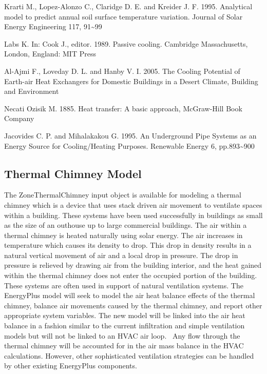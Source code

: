 Krarti M., Lopez-Alonzo C., Claridge D. E. and Kreider J. F. 1995. Analytical model to predict annual soil surface temperature variation. Journal of Solar Energy Engineering 117, 91\textasciitilde{}99

Labs K. In: Cook J., editor. 1989. Passive cooling. Cambridge Massachusetts, London, England: MIT Press

Al-Ajmi F., Loveday D. L. and Hanby V. I. 2005. The Cooling Potential of Earth-air Heat Exchangers for Domestic Buildings in a Desert Climate, Building and Environment

Necati Ozisik M. 1885. Heat transfer: A basic approach, McGraw-Hill Book Company

Jacovides C. P. and Mihalakakou G. 1995. An Underground Pipe Systems as an Energy Source for Cooling/Heating Purposes. Renewable Energy 6, pp.893\textasciitilde{}900

\subsection{Thermal Chimney Model}\label{thermal-chimney-model}

The ZoneThermalChimney input object is available for modeling a thermal chimney which is a device that uses stack driven air movement to ventilate spaces within a building. These systems have been used successfully in buildings as small as the size of an outhouse up to large commercial buildings. The air within a thermal chimney is heated naturally using solar energy. The air increases in temperature which causes its density to drop. This drop in density results in a natural vertical movement of air and a local drop in pressure. The drop in pressure is relieved by drawing air from the building interior, and the heat gained within the thermal chimney does not enter the occupied portion of the building. These systems are often used in support of natural ventilation systems. The EnergyPlus model will seek to model the air heat balance effects of the thermal chimney, balance air movements caused by the thermal chimney, and report other appropriate system variables. The new model will be linked into the air heat balance in a fashion similar to the current infiltration and simple ventilation models but will not be linked to an HVAC air loop.~ Any flow through the thermal chimney will be accounted for in the air mass balance in the HVAC calculations. However, other sophisticated ventilation strategies can be handled by other existing EnergyPlus components.

